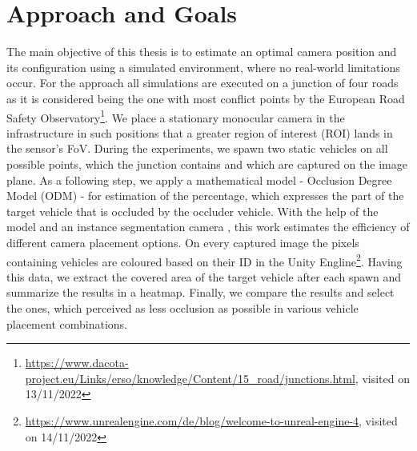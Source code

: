

\section{Approach and Goals}

The main objective of this thesis is to estimate an optimal camera position and its configuration using a simulated environment, where no real-world limitations occur. For the approach all simulations are executed on a junction of four roads as it is considered being the one with most conflict points by the European Road Safety Observatory\footnote{\url{https://www.dacota-project.eu/Links/erso/knowledge/Content/15_road/junctions.html}, visited on 13/11/2022}. We place a stationary monocular camera in the infrastructure in such positions that a greater region of interest (ROI) lands in the sensor's FoV. During the experiments, we spawn two static vehicles on all possible points, which the junction contains and which are captured on the image plane. As a following step, we apply a mathematical model - Occlusion Degree Model (ODM) \cite{occlusion_degree_model} - for estimation of the percentage, which expresses the part of the target vehicle that is occluded by the occluder vehicle. With the help of the model and an instance segmentation camera \cite{instance_segmenatation_cam}, this work estimates the efficiency of different camera placement options. On every captured image the pixels containing vehicles are coloured based on their ID in the Unity Engline\footnote{\url{https://www.unrealengine.com/de/blog/welcome-to-unreal-engine-4}, visited on 14/11/2022}. Having this data, we extract the covered area of the target vehicle after each spawn and summarize the results in a heatmap. Finally, we compare the results and select the ones, which perceived as less occlusion as possible in various vehicle placement combinations. 
\newpage

